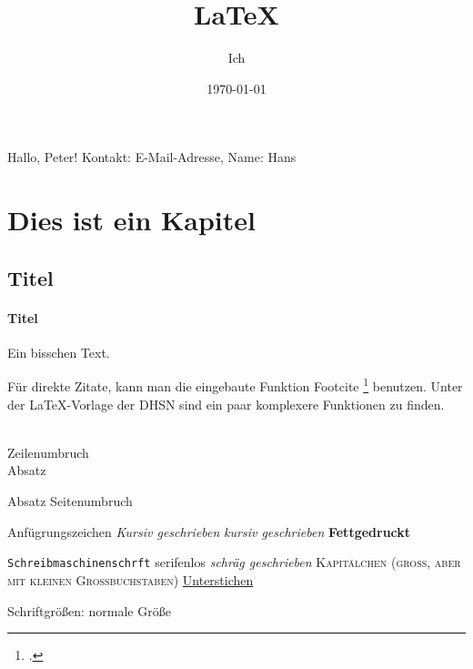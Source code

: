 \documentclass[a4paper, 12pt]{article}
\title{LaTeX}
\author{Ich}
\date{\today}
\newcommand{\gruss}[1]{Hallo, #1!}
\newcommand{\email}[2][E-Mail-Adresse]{Kontakt: #1, Name: #2}
\begin{document}
\gruss{Peter} %
\email{Hans} %

\maketitle
\tableofcontents %

\section{Dies ist ein Kapitel} %
\subsection{Titel} %
\paragraph{Titel} %


Ein bisschen Text.

Für direkte Zitate, kann man die eingebaute Funktion Footcite \footcite[2]{psgithub} benutzen.
Unter der LaTeX-Vorlage der DHSN sind ein paar komplexere Funktionen zu finden.

\\          Zeilenumbruch
\\[0,5cm]   Absatz
\par        Absatz
\newpage    Seitenumbruch

\glqq{}Anfügrungszeichen\grqq{}
\textit{Kursiv geschrieben}
\emph{kursiv geschrieben}
\textbf{Fettgedruckt}

\texttt{Schreibmaschinenschrft}
\textsf{serifenlos}
\textsl{schräg geschrieben}
\textsc{Kapitälchen (groß, aber mit kleinen Großbuchstaben)}
\underline{Unterstichen}

Schriftgrößen:
\normalsize{normale Größe}
\tiny{}
\small{}
\large{}
\Large{}
\huge{}
\Huge{}
\end{document}
